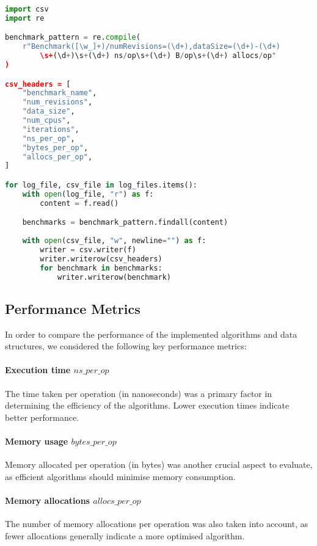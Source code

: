 \begin{lstlisting}[language=python]
import csv
import re

benchmark_pattern = re.compile(
    r"Benchmark([\w_]+)/numRevisions=(\d+),dataSize=(\d+)-(\d+)
        \s+(\d+)\s+(\d+) ns/op\s+(\d+) B/op\s+(\d+) allocs/op"
)

csv_headers = [
    "benchmark_name",
    "num_revisions",
    "data_size",
    "num_cpus",
    "iterations",
    "ns_per_op",
    "bytes_per_op",
    "allocs_per_op",
]

for log_file, csv_file in log_files.items():
    with open(log_file, "r") as f:
        content = f.read()

    benchmarks = benchmark_pattern.findall(content)
    
    with open(csv_file, "w", newline="") as f:
        writer = csv.writer(f)
        writer.writerow(csv_headers)
        for benchmark in benchmarks:
            writer.writerow(benchmark)

\end{lstlisting}

\subsection*{Performance Metrics}
In order to compare the performance of the implemented algorithms and data structures, we considered the following key performance metrics:

\paragraph{Execution time \(ns\_per\_op\)}
The time taken per operation (in nanoseconds) was a primary factor in determining the efficiency of the algorithms. Lower execution times indicate better performance.

\paragraph{Memory usage \(bytes\_per\_op\)}
Memory allocated per operation (in bytes) was another crucial aspect to evaluate, as efficient algorithms should minimise memory consumption.

\paragraph{Memory allocations \(allocs\_per\_op\)}
The number of memory allocations per operation was also taken into account, as fewer allocations generally indicate a more optimised algorithm.